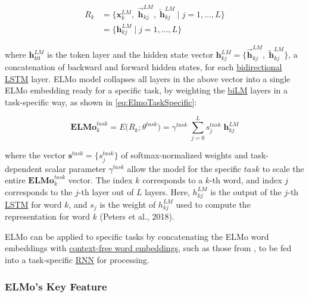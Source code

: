 \begin{equation}
\begin{array}{ll}
R_k 
&= \Big \{ \mathbf{x}_k^{LM}, \; \overrightarrow{\mathbf{h}}_{kj}^{LM}, \; \overleftarrow{\mathbf{h}}_{kj}^{LM} \; | \; j = 1,...,L \Big \} \\
&= \Big \{ \mathbf{h}_{kj}^{LM} \; | \; j = 1,...,L \Big \}
\end{array}
\label{eq:ElmoRvector}
\end{equation}

where $\mathbf{h}_{k0}^{LM}$ is the token layer and the hidden state vector $\mathbf{h}_{kj}^{LM} = \Big \{ \overrightarrow{\mathbf{h}}_{kj}^{LM}, \; \overleftarrow{\mathbf{h}}_{kj}^{LM}  \}$, a concatenation of backward and forward hidden states, for each \hyperref[sec:BidirectionalLM]{bidirectional} \hyperref[sec:LSTM]{LSTM} layer. ELMo model collapses all layers in the above vector into a single ELMo embedding ready for a specific task, by weighting the \hyperref[sec:BidirectionalLM]{biLM} layers in a task-specific way, as shown in \cref{eq:ElmoTaskSpecific}: 

\begin{equation}
\textbf{ELMo}_k^{task} = E \Big( R_k; \theta^{task} \Big) = \gamma^{task} \; \sum_{j=0}^L s_j^{task} \; \mathbf{h}_{kj}^{LM}
\label{eq:ElmoTaskSpecific}
\end{equation}

where the vector $\mathbf{s}^{task} = \Big\{ s_j^{task} \Big\}$ of softmax-normalized weights and task-dependent scalar parameter $\gamma^{task}$ allow the model for the specific $task$ to scale the entire $\textbf{ELMo}_k^{task}$ vector. The index $k$ corresponds to a $k$-th word, and index $j$ corresponds to the $j$-th layer out of $L$ layers. Here, $h_{kj}^{LM}$ is the output of the $j$-th \hyperref[sec:LSTM]{LSTM} for word $k$, and $s_j$ is the weight of $h_{kj}^{LM}$ used to compute the representation for word $k$ (Peters et al., 2018).

ELMo can be applied to specific tasks by concatenating the ELMo word embeddings with \hyperref[sec:StaticVsContextualEmb]{context-free word embeddings}, such as those from , to be fed into a task-specific \hyperref[sec:RNN]{RNN} for processing. 





\subsubsection{ELMo's Key Feature} \label{sec:ELMoKeyFeature}



